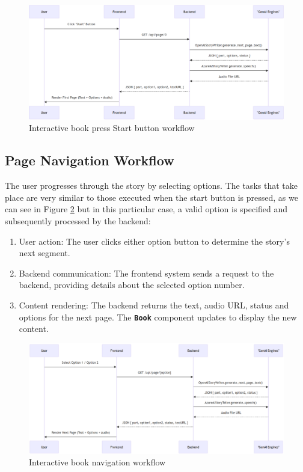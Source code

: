 \documentclass[conference]{IEEEtran}
\begin{document}
	\begin{figure}[H]
		\centering
		\includegraphics[width=0.7\linewidth]{img/img-ARI3333-initiation-workflow}
		\caption{Interactive book press Start button workflow}
		\label{fig:img-ari3333-initiation-workflow}
	\end{figure}
	
	\subsection{Page Navigation Workflow}
	
	The user progresses through the story by selecting options. The tasks that take place are very similar to those executed when the start button is pressed, as we can see in Figure \ref{fig:img-ari3333-navigation-workflow} but in this particular case, a valid option is specified and subsequently processed by the backend:

	\begin{enumerate}[]
		\item User action: The user clicks either option button to determine the story's next segment.
		\item Backend communication: The frontend system sends a request to the backend, providing details about the selected option number.
		\item Content rendering: The backend returns the text, audio URL, status and options for the next page. The \textbf{\texttt{Book}} component updates to display the new content.
	\end{enumerate}
	
	\begin{figure}[H]
		\centering
		\includegraphics[width=0.7\linewidth]{img/img-ARI3333-navigation-workflow}
		\caption{Interactive book navigation workflow}
		\label{fig:img-ari3333-navigation-workflow}
	\end{figure}
	
\end{document}
